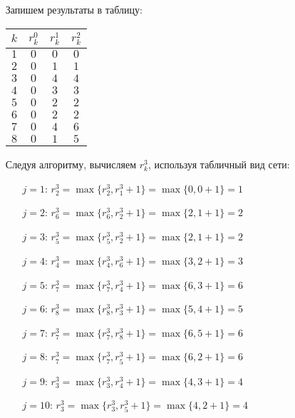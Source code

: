 \begin{itemize}[nosep]
	Запишем результаты в таблицу:

	\begin{table}[H]
		\centering
		\begin{tabular}{ | c | c | c | c |} 
			\hline
			$k$ & $r_k^0$ & $r_k^1$ & $r_k^2$ \\ \hline
			$1$ & $0$ & $0$ & $0$ \\ \hline
			$2$ & $0$ & $1$ & $1$ \\ \hline
			$3$ & $0$ & $4$ & $4$ \\ \hline
			$4$ & $0$ & $3$ & $3$ \\ \hline
			$5$ & $0$ & $2$ & $2$ \\ \hline
			$6$ & $0$ & $2$ & $2$ \\ \hline
			$7$ & $0$ & $4$ & $6$ \\ \hline
			$8$ & $0$ & $1$ & $5$ \\ \hline
		\end{tabular}
	\end{table}

	\item[\fbox{$i=3$}] Следуя алгоритму, вычисляем $r^3_k$, используя табличный вид сети:

	\begin{enumerate}[nosep]
		\item[\underline{$j=1$}:] $r_2^3 = \max\{r_2^3, r_1^3 + 1\} = \max\{0,0+1\} = 1$
		\item[\underline{$j=2$}:] $r_6^3 = \max\{r_6^3, r_2^3 + 1\} = \max\{2,1+1\} = 2$
		\item[\underline{$j=3$}:] $r_5^3 = \max\{r_5^3, r_2^3 + 1\} = \max\{2,1+1\} = 2$
		\item[\underline{$j=4$}:] $r_4^3 = \max\{r_4^3, r_6^3 + 1\} = \max\{3,2+1\} = 3$
		\item[\underline{$j=5$}:] $r_7^3 = \max\{r_7^3, r_4^3 + 1\} = \max\{6,3+1\} = 6$
		\item[\underline{$j=6$}:] $r_8^3 = \max\{r_8^3, r_3^3 + 1\} = \max\{5,4+1\} = 5$
		\item[\underline{$j=7$}:] $r_7^3 = \max\{r_7^3, r_8^3 + 1\} = \max\{6,5+1\} = 6$
		\item[\underline{$j=8$}:] $r_7^3 = \max\{r_7^3, r_5^3 + 1\} = \max\{6,2+1\} = 6$
		\item[\underline{$j=9$}:] $r_3^3 = \max\{r_3^3, r_4^3 + 1\} = \max\{4,3+1\} = 4$
		\item[\underline{$j=10$}:] $r_3^3 = \max\{r_3^3, r_5^3 + 1\} = \max\{4,2+1\} = 4$
	\end{enumerate}


\end{itemize}
